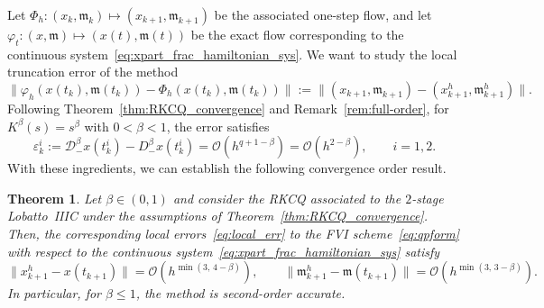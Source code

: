 \documentclass[a4paper,10pt,reqno]{amsart}
\newtheorem{theorem}{Theorem}[section]
\theoremstyle{definition}
\newcommand{\m}{\mathfrak{m}}
\begin{document}
Let $\Phi_h:(x_k,\m_k)\mapsto (x_{k+1},\m_{k+1})$ be the associated one-step flow, and let $\varphi_t:(x,\m)\mapsto (x(t),\m(t))$ be the exact flow corresponding to the continuous system~\eqref{eq:xpart_frac_hamiltonian_sys}. We want to study the local truncation error of the method
\begin{equation}\label{eq:local_err}
    \|\varphi_h(x(t_k),\m(t_k))-\Phi_h(x(t_k),\m(t_k))\|:=\|(x_{k+1},\m_{k+1})-(x_{k+1}^h,\m_{k+1}^h)\|.
\end{equation}
Following Theorem~\ref{thm:RKCQ_convergence} and Remark~\ref{rem:full-order}, for $K^{\beta}(s) = s^{\beta}$ with $0 < \beta < 1$, the
 error satisfies
\begin{equation}\label{eq:stage_frac}
 \varepsilon_k^i := \mathcal{D}_-^{\beta}x(t_k^i)
  - D_{-}^{\beta} x(t_k^i)
  = \mathcal{O}\!\left(h^{q+1-\beta}\right)= \mathcal{O}\!\left(h^{2-\beta}\right), \qquad i = 1,2.
\end{equation}
With these ingredients, we can establish the following convergence order result.
\begin{theorem}\label{thm:theoretical_convergence}
Let $\beta\in (0,1)$  and consider the RKCQ associated to the $2$-stage Lobatto~IIIC under the assumptions of Theorem~\ref{thm:RKCQ_convergence}. Then, the corresponding local  errors~\eqref{eq:local_err} to the FVI scheme~\eqref{eq:qpform} with respect to the continuous system~\eqref{eq:xpart_frac_hamiltonian_sys} satisfy
 \begin{equation}\label{eq:global-general}
        \|x_{k+1}^h - x(t_{k+1})\|=  \mathcal O\!\left(h^{\min(3,\, 4-\beta)}\right),\qquad  \|\m_{k+1}^h - \m(t_{k+1})\| =\mathcal O\!\left(h^{\min(3,\, 3-\beta)}\right).
    \end{equation}
In particular, for $\beta \leq 1$, the method is second-order accurate.
\end{theorem}
\end{document}
